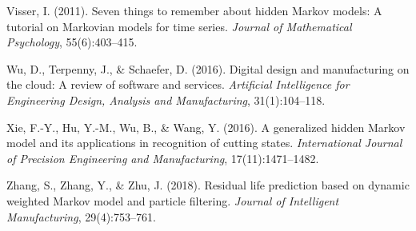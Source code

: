 \documentclass{CUP-JNL-DCE}
\begin{document}
\begin{Backmatter}
\begin{thebibliography}{}
Visser, I. (2011). Seven things to remember about hidden Markov models: A
tutorial on Markovian models for time series. \textit{Journal of Mathematical Psychology}, 55(6):403--415.

Wu, D., Terpenny, J., {\&} Schaefer, D. (2016). Digital design and
manufacturing on the cloud: A review of software and services. \textit{Artificial Intelligence for Engineering Design, Analysis and Manufacturing}, 31(1):104--118.

Xie, F.-Y., Hu, Y.-M., Wu, B., {\&} Wang, Y. (2016). A generalized hidden
Markov model and its applications in recognition of cutting states.
\textit{International Journal of Precision Engineering and Manufacturing}, 17(11):1471--1482.

Zhang, S., Zhang, Y., {\&} Zhu, J. (2018). Residual life prediction based on
dynamic weighted Markov model and particle filtering. \textit{Journal of Intelligent Manufacturing}, 29(4):753--761.

\end{thebibliography}


\end{Backmatter}
\end{document}
